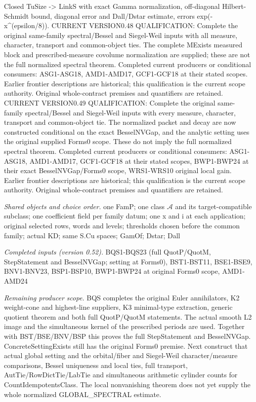 \documentclass[11pt,a4paper]{article}
\numberwithin{equation}{section}
\theoremstyle{remark}\newtheorem{remark}[theorem]{Remark}
\begin{document}
Closed TuSize -> LinkS with exact Gamma normalization, off-diagonal Hilbert-Schmidt bound, diagonal error and Dall/Dstar estimate, errors exp(-x\textasciicircum{}(epsilon/8)). CURRENT VERSION0.48 QUALIFICATION: Complete the original same-family spectral/Bessel and Siegel-Weil inputs with all measure, character, transport and common-object ties. The complete MExists measured block and prescribed-measure covolume normalization are supplied; these are not the full normalized spectral theorem. Completed current producers or conditional consumers: ASG1-ASG18, AMD1-AMD17, GCF1-GCF18 at their stated scopes. Earlier frontier descriptions are historical; this qualification is the current scope authority. Original whole-contract premises and quantifiers are retained. CURRENT VERSION0.49 QUALIFICATION: Complete the original same-family spectral/Bessel and Siegel-Weil inputs with every measure, character, transport and common-object tie. The normalized packet and decay are now constructed conditional on the exact BesselNVGap, and the analytic setting uses the original supplied Forms0 scope. These do not imply the full normalized spectral theorem. Completed current producers or conditional consumers: ASG1-ASG18, AMD1-AMD17, GCF1-GCF18 at their stated scopes, BWP1-BWP24 at their exact BesselNVGap/Forms0 scope, WRS1-WRS10 original local gain. Earlier frontier descriptions are historical; this qualification is the current scope authority. Original whole-contract premises and quantifiers are retained.

\emph{Shared objects and choice order.} one FamP; one class $\mathcal A$ and its target-compatible subclass; one coefficient field per family datum; one x and i at each application; original selected rows, words and levels; thresholds chosen before the common family; actual KD; same S.Cu spaces; GamOf; Dstar; Dall

\emph{Completed inputs (version 0.52).} BQS1-BQS23 (full QuotP/QuotM, StepStatement and BesselNVGap; setting at Forms0), BST1-BST11, BSE1-BSE9, BNV1-BNV23, BSP1-BSP10, BWP1-BWP24 at original Forms0 scope, AMD1-AMD24

\emph{Remaining producer scope.} BQS completes the original Euler annihilators, K2 weight-cone and highest-line suppliers, K3 minimal-type extraction, generic quotient theorem and both full QuotP/QuotM statements. The actual smooth L2 image and the simultaneous kernel of the prescribed periods are used. Together with BST/BSE/BNV/BSP this proves the full StepStatement and BesselNVGap. ConcreteSettingExists still has the original Forms0 premise. Next construct that actual global setting and the orbital/fiber and Siegel-Weil character/measure comparisons, Bessel uniqueness and local ties, full transport, AutTie/RowDictTie/LabTie and simultaneous arithmetic cylinder counts for CountIdempotentsClass. The local nonvanishing theorem does not yet supply the whole normalized GLOBAL\_\allowbreak SPECTRAL estimate.
\end{document}
